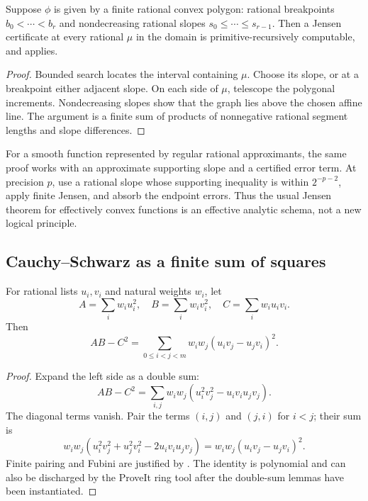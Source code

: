 \begin{proposition}\label{prop:polygonal-jensen}
Suppose \(\phi\) is given by a finite rational convex polygon: rational
breakpoints \(b_0<\cdots<b_r\) and nondecreasing rational slopes
\(s_0\le\cdots\le s_{r-1}\).  Then a Jensen certificate at every rational
\(\mu\) in the domain is primitive-recursively computable, and
 applies.
\end{proposition}

\begin{proof}
Bounded search locates the interval containing \(\mu\).  Choose its slope, or
at a breakpoint either adjacent slope.  On each side of \(\mu\), telescope the
polygonal increments.  Nondecreasing slopes show that the graph lies above the
chosen affine line.  The argument is a finite sum of products of nonnegative
rational segment lengths and slope differences.
\end{proof}

\begin{remark}
For a smooth function represented by regular rational approximants, the same
proof works with an approximate supporting slope and a certified error term.
At precision \(p\), use a rational slope whose supporting inequality is within
\(2^{-p-2}\), apply finite Jensen, and absorb the endpoint errors.  Thus the
usual Jensen theorem for effectively convex functions is an effective analytic
schema, not a new logical principle.
\end{remark}

\subsection{Cauchy--Schwarz as a finite sum of squares}

\begin{lemma}\label{lem:lagrange}
For rational lists \(u_i,v_i\) and natural weights \(w_i\), let
\[
 A=\sum_iw_iu_i^2,\quad B=\sum_iw_iv_i^2,\quad C=\sum_iw_iu_iv_i.
\]
Then
\[
 AB-C^2
 =\sum_{0\le i<j<m}w_iw_j(u_iv_j-u_jv_i)^2.
\]
\end{lemma}

\begin{proof}
Expand the left side as a double sum:
\[
 AB-C^2=\sum_{i,j}w_iw_j(u_i^2v_j^2-u_iv_iu_jv_j).
\]
The diagonal terms vanish.  Pair the terms \((i,j)\) and \((j,i)\) for
\(i<j\); their sum is
\[
 w_iw_j(u_i^2v_j^2+u_j^2v_i^2-2u_iv_iu_jv_j)
 =w_iw_j(u_iv_j-u_jv_i)^2.
\]
Finite pairing and Fubini are justified by .  The
identity is polynomial and can also be discharged by the ProveIt ring tool
after the double-sum lemmas have been instantiated.
\end{proof}


